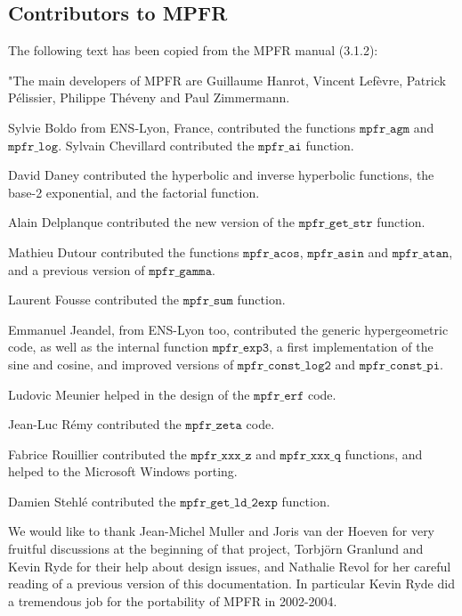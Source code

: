 \subsection{Contributors to MPFR}
\label{Contributors to MPFR}
The following text has been copied from the MPFR manual (3.1.2):

\vpara
"The main developers of MPFR are Guillaume Hanrot, Vincent Lef\`evre,
Patrick P\'elissier, Philippe Th\'eveny and Paul Zimmermann.

\vpara
Sylvie Boldo from ENS-Lyon, France,
contributed the functions $\mathtt{mpfr\_agm}$ and $\mathtt{mpfr\_log}$.
Sylvain Chevillard contributed the $\mathtt{mpfr\_ai}$ function.

\vpara
David Daney contributed the hyperbolic and inverse hyperbolic functions,
the base-2 exponential, and the factorial function.

\vpara
Alain Delplanque contributed the new version of the $\mathtt{mpfr\_get\_str}$
function.

\vpara
Mathieu Dutour contributed the functions $\mathtt{mpfr\_acos}$, $\mathtt{mpfr\_asin}$
and $\mathtt{mpfr\_atan}$, and a previous version of $\mathtt{mpfr\_gamma}$.

\vpara
Laurent Fousse contributed the $\mathtt{mpfr\_sum}$ function.

\vpara
Emmanuel Jeandel, from ENS-Lyon too,
contributed the generic hypergeometric code,
as well as the internal function $\mathtt{mpfr\_exp3}$,
a first implementation of the sine and cosine,
and improved versions of
$\mathtt{mpfr\_const\_log2}$ and $\mathtt{mpfr\_const\_pi}$.

\vpara
Ludovic Meunier helped in the design of the $\mathtt{mpfr\_erf}$ code.

\vpara
Jean-Luc R\'emy contributed the $\mathtt{mpfr\_zeta}$ code.

\vpara
Fabrice Rouillier contributed the $\mathtt{mpfr\_xxx\_z}$ and $\mathtt{mpfr\_xxx\_q}$
functions, and helped to the Microsoft Windows porting.

\vpara
Damien Stehl\'e contributed the $\mathtt{mpfr\_get\_ld\_2exp}$ function.

\vpara
We would like to thank Jean-Michel Muller and Joris van der Hoeven for very
fruitful discussions at the beginning of that project, Torbj\"orn Granlund
and Kevin Ryde for their help about design issues,
and Nathalie Revol for her careful reading of a previous version of
this documentation. In particular
Kevin Ryde did a tremendous job for the portability of MPFR in 2002-2004.

